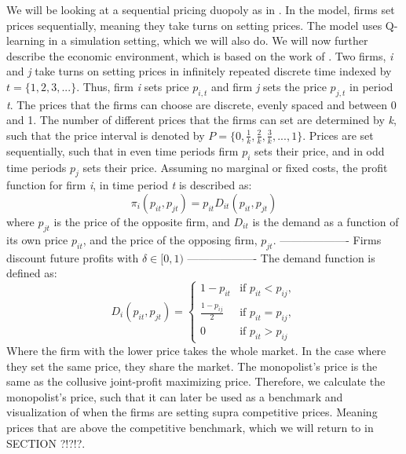 \documentclass{article}
\begin{document}
We will be looking at a sequential pricing duopoly as in \cite{Klein2021}. In the model, firms set prices sequentially, meaning they take turns on setting prices. The model uses Q-learning in a simulation setting, which we will also do.
We will now further describe the economic environment, which is based on the work of \cite{Klein2021}. 
\newline
Two firms, \textit{i} and \textit{j} take turns on setting prices in infinitely repeated discrete time indexed by $t = \{1,2,3,... \} $. Thus, firm \textit{i} sets price $p_{i,t}$ and firm \textit{j} sets the price $p_{j,t}$ in period \textit{t}. 
The prices that the firms can choose are discrete, evenly spaced and between 0 and 1. The number of different prices that the firms can set are determined by \textit{k}, such that the price interval is denoted by $P = \{0, \frac{1}{k}, \frac{2}{k}, \frac{3}{k},...,1\} $. Prices are set sequentially, such that in even time periods firm $p_i$ sets their price, and in odd time periods $p_j$ sets their price.
\newline
Assuming no marginal or fixed costs, the profit function for firm \textit{i}, in time period \textit{t} is described as:
\begin{equation}
    \pi_i (p_{it},p_{jt}) = p_{it}D_{it}(p_{it},p_{jt})
\end{equation}
where $p_{jt}$ is the price of the opposite firm, and $D_{it}$ is the demand as a function of its own price $p_{it}$, and the price of the opposing firm, $p_{jt}$.
\newline
-------------------
Firms discount future profits with $\delta \in [0,1)$
-------------------
\newline
The demand function is defined as:
\begin{equation}
D_i(p_{it},p_{jt}) =
\begin{cases}
  1-p_{it} &\text{if } p_{it} < p_{ij},\\
  \frac{1-p_{ij}}{2}   & \text{if } p_{it} =p_{ij},\\
  0   & \text{if } p_{it} > p_{ij}
\end{cases}
\end{equation}
Where the firm with the lower price takes the whole market. In the case where they set the same price, they share the market. The monopolist's price is the same as the collusive joint-profit maximizing price. Therefore, we calculate the monopolist's price, such that it can later be used as a benchmark and visualization of when the firms are setting supra competitive prices. Meaning prices that are above the competitive benchmark, which we will return to in SECTION ?!?!?.
\end{document}
